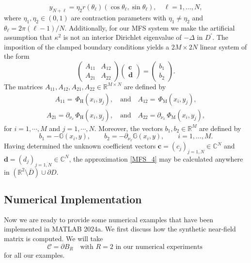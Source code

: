 \documentclass{article}
\begin{document}
\begin{equation}
    \label{eq:mfs2}
    y_{N+\ell}=\eta_2 r(\theta_\ell)(\cos{\theta_\ell},\sin{\theta_\ell}),\quad \ell=1,\dots,N,
\end{equation}
where $\eta_1,\eta_2 \in (0,1)$ are contraction parameters with $\eta_1\neq \eta_2$ and $\theta_\ell=2\pi (\ell-1)/N$. Additionally, for our MFS system we make the artificial assumption that $\kappa^2$ is not an interior Dirichlet eigenvalue of $-\Delta$ in $D^\prime$.
The imposition of the clamped boundary conditions yields a $2M\times 2N$ linear system of the form
\begin{equation}
\left(
\begin{array}{c|c}
A_{11} & A_{12} \\
\hline
A_{21} & A_{22}
\end{array}
\right)\begin{pmatrix}
\mathbf{c} \\
\hline
\mathbf{d}
\end{pmatrix}=\begin{pmatrix}
b_1 \\
\hline
b_2
\end{pmatrix}.
\end{equation}
The matrices $A_{11}, A_{12}, A_{21}, A_{22} \in \mathbb{R}^{M \times N}$ are defined by
\begin{align*}
A_{11} =  \, \Phi_{\mathrm{H}}(x_i, y_j), 
\quad\text{and}\quad
A_{12} =  \, \Phi_{\mathrm{M}}(x_i, y_j),
\end{align*}
\begin{align*}
A_{21} = \partial_{\nu_{x}} \, \Phi_{\mathrm{H}}(x_i, y_j), 
\quad \text{and}\quad
A_{22} = \partial_{\nu_{x}} \, \Phi_{\mathrm{M}}(x_i, y_j),
\end{align*}
for $i=1,\cdots,M$ and $j=1,\cdots, N$. Moreover, the vectors $b_1,b_2\in \mathbb R^{M}$ are defined by
\[
b_1 = -\mathbb{G}(x_i, y), 
\qquad
b_2 = -\partial_{\nu_{x}} \mathbb{G}(x_i, y),
\qquad i = 1,\dots,M.
\]
Having determined the unknown coefficient vectors $\mathbf c=(c_j)_{j=\overline{1,N}}\in \mathbb C^{N}$ and $\mathbf d=(d_j)_{j=\overline{1,N}}\in \mathbb C^{N}$, the approximation \eqref{MFS_4} may be calculated anywhere in $(\mathbb R^2\setminus\overline D)\cup \partial D$.
\subsection{Numerical Implementation}
Now we are ready to provide some numerical examples that have been implemented in \textsf{MATLAB} 2024a.
We first discuss how the synthetic near-field matrix is computed. We will take
\[
\mathcal C=\partial B_R\quad \text{with }R=2 \text{ in our numerical experiments }
\]
for all our examples. 
\end{document}
